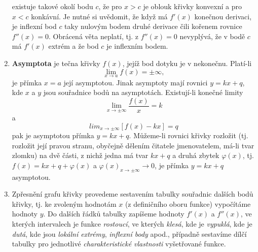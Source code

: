 \begin{enumerate}
            existuje takové okolí bodu $c$, že pro $x>c$ je oblouk křivky konvexní a pro $x<c$ konkávní. Je nutné si uvědomit, že když má $f'(x)$ konečnou derivaci, 
            je inflexní bod $c$ taky nulovým bodem druhé derivace čili kořenem rovnice $f''(x)=0$. Obrácená věta neplatí, tj. z $f''(x)=0$ nevyplývá, že v bodě $c$ 
            má $f'(x)$ extrém a že bod $c$ je inflexním bodem.
      \item \textbf{Asymptota} je tečna křivky $f(x)$, jejíž bod dotyku je v nekonečnu. Platí-li $$\lim_{x \to a}f(x) = \pm\infty,$$ je přímka $x=a$ její asymptotou.
            Jinak asymptoty mají rovnici $y=kx+q$, kde $x$ a $y$ jsou souřadnice bodů na asymptotách. Existují-li konečné limity 
            $$\lim_{x \to \pm\infty}\frac{f(x)}{x}=k$$  a $$lim_{x \to \pm\infty}[f(x)-kx] =q$$ pak je asymptotou přímka $y=kx+q$. Můžeme-li rovnici křivky rozložit 
            (tj. rozložit její pravou stranu, oby\-čejně dělením čitatele jmenovatelem, má-li tvar zlomku) na dvě části, z nichž jedna má tvar $kx+q$ a druhá zbytek 
            $\varphi(x)$, tj. $f(x)=kx+q+\varphi(x)$ a $\varphi(x)_{x\rightarrow\pm\infty}\rightarrow 0$, je přímka $y=kx+q$ asymptotou.
      \item Zpřesnění grafu křivky provedeme sestavením tabulky souřadnic dalších bodů křivky, tj. ke zvoleným hodnotám $x$ (z definičního oboru funkce) vypočítáme 
            hodnoty $y$. Do dalších řádků tabulky zapíšeme hodnoty  $f'(x)$ a $f''(x)$, ve kterých intervalech je funkce \emph{rostoucí}, ve kterých \emph{klesá}, 
            kde je \emph{vypuklá}, kde je \emph{dutá}, kde jsou \emph{lokální extrémy}, \emph{inflexní body} apod., případně sestavíme dílčí tabulky pro jednotlivé 
            \emph{charakteristické vlastnosti} vyšetřované funkce.
    \end{enumerate}
